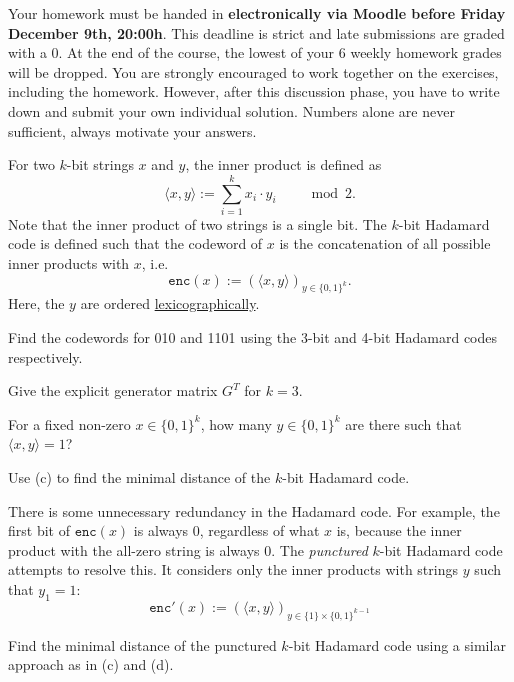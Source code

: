 \documentclass[a4paper,10pt,landscape,twocolumn]{scrartcl}
\newcommand\deadline{Friday December 9th, 20:00h}
\begin{document}
\homeworkproblems

{\sffamily\noindent
Your homework must be handed in \textbf{electronically via Moodle before \deadline}. This deadline is strict and late submissions are graded with a 0. At the end of the course, the lowest of your 6 weekly homework grades will be dropped. You are strongly encouraged to work together on the exercises, including the homework. However, after this discussion phase, you have to write down and submit your own individual solution. Numbers alone are never sufficient, always motivate your answers.
}

\newcommand{\ip}[2]{\langle #1, #2\rangle}
\begin{exercise}
For two $k$-bit strings $x$ and $y$, the inner product is defined as
\[
\ip{x}{y} := \sum_{i=1}^k x_i\cdot y_i \ \ \ \ \ \ \ \ \mod 2.
\]
Note that the inner product of two strings is a single bit. The $k$-bit Hadamard code is defined such that the codeword of $x$ is the concatenation of all possible inner products with $x$, i.e.
\[
\mathtt{enc}(x) := \left(\ip{x}{y}\right)_{y \in \{0,1\}^k}.
\]
Here, the $y$ are ordered \href{https://en.wikipedia.org/wiki/Lexicographical_order}{lexicographically}.
	\begin{subex}[(1pt)]
	Find the codewords for 010 and 1101 using the 3-bit and 4-bit Hadamard codes respectively.
	\end{subex}
	\begin{subex}[(1pt)]
	Give the explicit generator matrix $G^T$ for $k = 3$.
	\end{subex}
	\begin{subex}[(2pt)]
	For a fixed non-zero $x \in \{0,1\}^k$, how many $y \in \{0,1\}^k$ are there such that $\ip{x}{y} = 1$?
	\end{subex}
	\begin{subex}[(1pt)]
	Use (c) to find the minimal distance of the $k$-bit Hadamard code.
	\end{subex}
There is some unnecessary redundancy in the Hadamard code. For example, the first bit of $\mathtt{enc}(x)$ is always 0, regardless of what $x$ is, because the inner product with the all-zero string is always 0. The \emph{punctured} $k$-bit Hadamard code attempts to resolve this. It considers only the inner products with strings $y$ such that $y_1 = 1$:
\[
\mathtt{enc}'(x) := \left(\ip{x}{y}\right)_{y \in \{1\} \times \{0,1\}^{k-1}}
\]
	\begin{subex}[(3pt)]
	Find the minimal distance of the punctured $k$-bit Hadamard code using a similar approach as in (c) and (d).

\end{subex}
\end{exercise}
\end{document}

